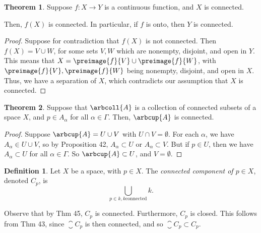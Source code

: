 \documentclass[a5paper]{article}
\theoremstyle{definition}%
\newtheorem{theorem}{Theorem}
\newtheorem*{definition*}{Definition}
\numberwithin{exercise}{section}
\theoremstyle{remark}%
\begin{document}
\begin{highlight}
\begin{theorem}
Suppose $f:X\to Y$ is a continuous function, and $X$ is connected.

Then, $f(X)$ is connected. In particular, if $f$ is onto, then $Y$ is connected. 
\end{theorem}
\end{highlight}
\begin{proof}
Suppose for contradiction that $f(X)$ is not connected. Then $f(X)=V\cup W$, for some sets $V,W$ which are nonempty, disjoint, and open in $Y$. This means that $X=\preimage{f}{V}\cup \preimage{f}{W}$, with $\preimage{f}{V}, \preimage{f}{W}$ being nonempty, disjoint, and open in $X$. Thus, we have a separation of $X$, which contradicts our assumption that $X$ is connected. 
\end{proof}

\begin{highlight}
\begin{theorem}
Suppose that $\arbcoll{A}$ is a collection of connected subsets of a space $X$, and $p\in A_\alpha$ for all $\alpha\in\Gamma$. Then, $\arbcup{A}$ is connected. 
\end{theorem}
\end{highlight}
\begin{proof}
Suppose $\arbcup{A}=U\cup V$ with $U\cap V=\emptyset$. For each $\alpha$, we have $A_\alpha\in U\cup V$, so by Proposition 42, $A_\alpha \subset U$ or $A_\alpha \subset V$. But if $p\in U$, then we have $A_\alpha \subset U$ for all $\alpha \in \Gamma$. So $\arbcup{A}\subset U$, and $V=\emptyset$. 
\end{proof}

\begin{highlight}
\begin{definition*}
Let $X$ be a space, with $p\in X$. The \emph{connected component of $p\in X$}, denoted $C_p$, is 
$$\bigcup_{p\in k,  k \text{connected}} k.$$
\end{definition*}
\end{highlight}
Observe that by Thm 45, $C_p$ is connected. Furthermore, $C_p$ is closed. This follows from Thm 43, since $\closure{C_p}$ is then connected, and so $\closure{C_p}\subset C_p$. 
\end{document}
